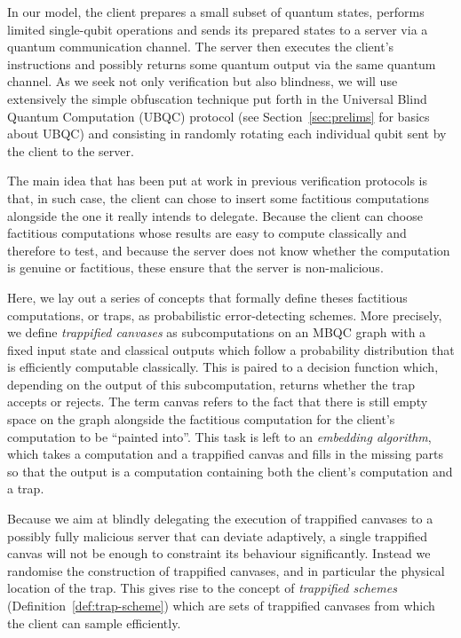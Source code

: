 \documentclass[12pt]{iopart}
\makeatletter
\renewcommand{\1}{\mathds{1}}
\renewcommand\paragraph{\@startsection{paragraph}{4}{\z@}{1ex \@plus.5ex \@minus.1ex}{-0.7em}{\normalfont\normalsize\itshape}}
\makeatother
\begin{document}
In our model, the client prepares a small subset of quantum states, performs limited single-qubit operations and sends its prepared states to a server via a quantum communication channel.
The server then executes the client's instructions and possibly returns some quantum output via the same quantum channel.
As we seek not only verification but also blindness, we will use extensively the simple obfuscation technique put forth in the Universal Blind Quantum Computation (UBQC) protocol (see Section~\ref{sec:prelims} for basics about UBQC) and consisting in randomly rotating each individual qubit sent by the client to the server.

The main idea that has been put at work in previous verification protocols is that, in such case, the client can chose to insert some factitious computations alongside the one it really intends to delegate.
Because the client can choose factitious computations whose results are easy to compute classically and therefore to test, and because the server does not know whether the computation is genuine or factitious, these ensure that the server is non-malicious.

\paragraph{Analysing Deviations with Traps (Section \ref{sec:detect}).}
Here, we lay out a series of concepts that formally define theses factitious computations, or traps, as probabilistic error-detecting schemes.
More precisely, we define \emph{trappified canvases} as subcomputations on an MBQC graph with a fixed input state and classical outputs which follow a probability distribution that is efficiently computable classically.
This is paired to a decision function which, depending on the output of this subcomputation, returns whether the trap accepts or rejects.
The term canvas refers to the fact that there is still empty space on the graph alongside the factitious computation for the client's computation to be ``painted into''.
This task is left to an \emph{embedding algorithm}, which takes a computation and a trappified canvas and fills in the missing parts so that the output is a computation containing both the client's computation and a trap.

Because we aim at blindly delegating the execution of trappified canvases to a possibly fully malicious server that can deviate adaptively, a single trappified canvas will not be enough to constraint its behaviour significantly.
Instead we randomise the construction of trappified canvases, and in particular the physical location of the trap.
This gives rise to the concept of \emph{trappified schemes} (Definition~\ref{def:trap-scheme}) which are sets of trappified canvases from which the client can sample efficiently.
\end{document}
